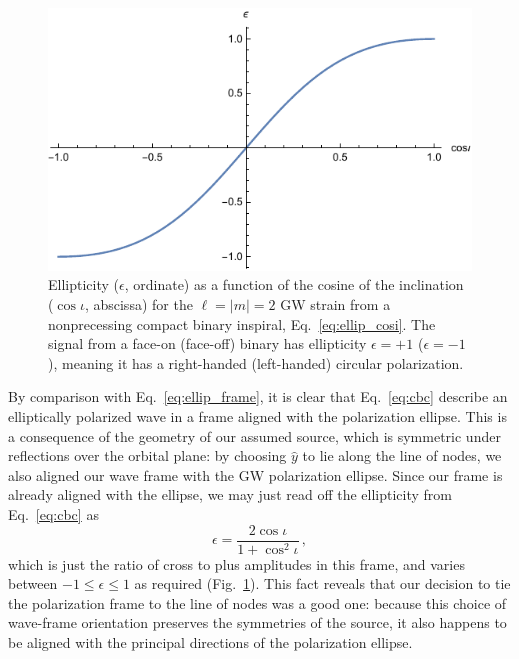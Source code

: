 \documentclass[aps,prd,twocolumn,superscriptaddress,preprintnumbers,floatfix,nofootinbib]{revtex4-2}
\newcommand{\beq}{\begin{equation}}
\newcommand{\eeq}{\end{equation}}
\begin{document}
\begin{figure}
\includegraphics[width=\columnwidth]{ellip_cosi}
\caption{Ellipticity ($\epsilon$, ordinate) as a function of the cosine of the inclination ($\cos\iota$, abscissa) for the $\ell = |m| = 2$ GW strain from a nonprecessing compact binary inspiral, Eq.~\eqref{eq:ellip_cosi}. The signal from a face-on (face-off) binary has ellipticity $\epsilon = +1$ ($\epsilon=-1$), meaning it has a right-handed (left-handed) circular polarization.}
\label{fig:ellip_cosi}
\end{figure}

By comparison with Eq.~\eqref{eq:ellip_frame}, it is clear that Eq.~\eqref{eq:cbc} describe an elliptically polarized wave in a frame aligned with the polarization ellipse.
This is a consequence of the geometry of our assumed source, which is symmetric under reflections over the orbital plane: by choosing $\hat{y}$ to lie along the line of nodes, we also aligned our wave frame with the GW polarization ellipse.
Since our frame is already aligned  with the ellipse, we may just read off the ellipticity from Eq.~\eqref{eq:cbc} as
\beq \label{eq:ellip_cosi}
\epsilon = \frac{2 \cos\iota}{1 + \cos^2\iota}\, ,
\eeq
which is just the ratio of cross to plus amplitudes in this frame, and varies between $-1 \leq \epsilon \leq 1$ as required (Fig.~\ref{fig:ellip_cosi}).
This fact reveals that our decision to tie the polarization frame to the line of nodes was a good one: because this choice of wave-frame orientation preserves the symmetries of the source, it also happens to be aligned with the principal directions of the polarization ellipse.
\end{document}
